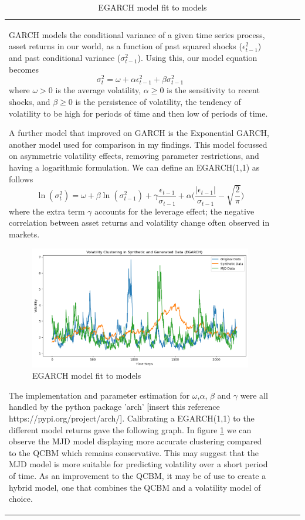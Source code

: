 \documentclass[12pt]{article}
\newcommand{\newp}
    {
    \vskip 0.5cm 
  }
\numberwithin{equation}{section}
\begin{document}
\begin{table}[h!]
\begin{tabular}{|l|c|c|c|}
GARCH models the conditional variance of a given time series process, asset returns in 
our world, as a function of past squared shocks ($\epsilon^2_{t-1}$) and past 
conditional variance ($\sigma^2_{t-1}$). Using this, our model equation becomes
\begin{equation}
  \sigma^2_t = \omega + \alpha\epsilon^2_{t-1} + \beta\sigma^2_{t-1}
\end{equation}
where $\omega > 0$ is the average volatility, $\alpha \geq 0$ is the sensitivity 
to recent shocks, and $\beta \geq0$ is the persistence of volatility, the tendency
of volatility to be high for periods of time and then low of periods of time. 
\newp 
A further model that improved on GARCH is the Exponential GARCH, another model used 
for comparison in my findings. This model focussed on asymmetric volatility 
effects, removing parameter restrictions, and having a logarithmic formulation. 
We can define an EGARCH(1,1) as follows 
\begin{equation}
  \ln(\sigma^2_t) = \omega +\beta\ln(\sigma^2_{t-1})+\gamma\frac{\epsilon_{t-1}}
  {\sigma_{t-1}} + \alpha\Biggl(\frac{|\epsilon_{t-1}|}{\sigma_{t-1}}-\sqrt{\frac{2}{\pi}}\Biggr)
\end{equation}
where the extra term $\gamma$ accounts for the leverage effect; the 
negative correlation between asset returns and volatility change often 
observed in markets.
\newp 
\begin{figure}[h!]
  \centering 
  \includegraphics[scale=0.4]{egarch2.png}
  \caption{EGARCH model fit to models}
  \label{fig:egarch2}
\end{figure}
The implementation and parameter estimation for $\omega$,$\alpha$, $\beta$ and 
$\gamma$ were all handled by 
the python package 'arch' [insert this reference https://pypi.org/project/arch/]. 
Calibrating a EGARCH(1,1) to the different model returns gave the following graph. 
In figure \ref{fig:egarch2} we can observe the MJD model displaying more accurate 
clustering compared to the QCBM which remains conservative. This may suggest that 
the MJD model is more suitable for predicting volatility over a short period of 
time. As an improvement to the QCBM, it may be of use to create a hybrid model, 
one that combines the QCBM and a volatility model of choice. 


\end{tabular}
\end{table}
\end{document}
